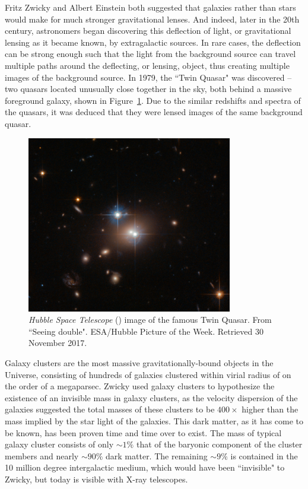 Fritz Zwicky and Albert Einstein both suggested that galaxies rather than stars would make for much stronger gravitational lenses. And indeed, later in the 20th century, astronomers began discovering this deflection of light, or gravitational lensing as it became known, by extragalactic sources. In rare cases, the deflection can be strong enough such that the light from the background source can travel multiple paths around the deflecting, or lensing, object, thus creating multiple images of the background source. In 1979, the ``Twin Quasar" was discovered -- two quasars located unusually close together in the sky, both behind a massive foreground galaxy, shown in Figure~\ref{intro:fig:quasar}. Due to the similar redshifts and spectra of the quasars, it was deduced that they were lensed images of the same background quasar.

\begin{figure}
\centering
\includegraphics[width=0.8\textwidth]{Intro/twin_quasar.png}
\caption[\hst\ image of the Twin Quasar]{{\it Hubble Space Telescope} (\hst) image of the famous Twin Quasar. From  ``Seeing double". ESA/Hubble Picture of the Week. Retrieved 30 November 2017.}
\label{intro:fig:quasar}
\end{figure}

Galaxy clusters are the most massive gravitationally-bound objects in the Universe, consisting of hundreds of galaxies clustered within virial radius of on the order of a megaparsec. Zwicky used galaxy clusters to hypothesize the existence of an invisible mass in galaxy clusters, as the velocity dispersion of the galaxies suggested the total masses of these clusters to be $400\times$ higher than the mass implied by the star light of the galaxies. This dark matter, as it has come to be known, has been proven time and time over to exist. The mass of typical galaxy cluster consists of only $\sim1\%$ that of the baryonic component of the cluster members and nearly $\sim90\%$ dark matter. The remaining $\sim9\%$ is contained in the 10 million degree intergalactic medium, which would have been ``invisible" to Zwicky, but today is visible with X-ray telescopes.

